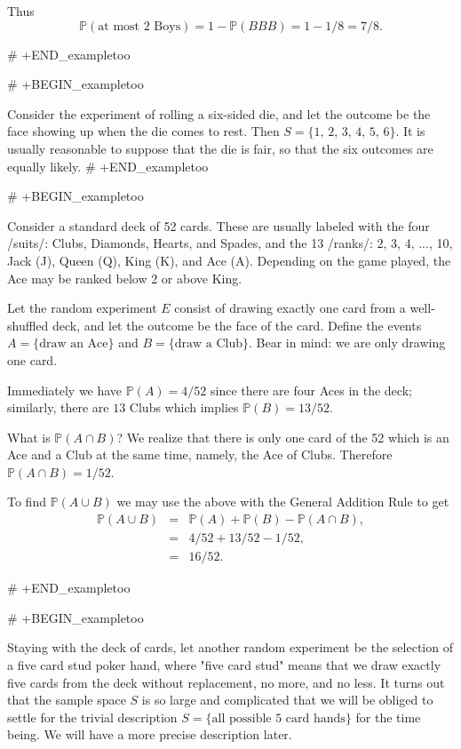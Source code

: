 Thus \[ \mathbb{P}(\mbox{at most 2 Boys}) = 1 - \mathbb{P}(BBB) = 1 -
1/8 = 7/8. \]

# +END_exampletoo


# +BEGIN_exampletoo

Consider the experiment of rolling a six-sided die, and let the
outcome be the face showing up when the die comes to rest. Then \( S =
\{ 1,\,2,\,3,\,4,\,5,\,6 \} \). It is usually reasonable to suppose
that the die is fair, so that the six outcomes are equally likely.
# +END_exampletoo


# +BEGIN_exampletoo

Consider a standard deck of 52 cards. These are usually labeled with
the four /suits/: Clubs, Diamonds, Hearts, and Spades, and the 13
/ranks/: 2, 3, 4, ..., 10, Jack (J), Queen (Q), King (K), and Ace
(A). Depending on the game played, the Ace may be ranked below 2 or
above King.

Let the random experiment \(E\) consist of drawing exactly one card
from a well-shuffled deck, and let the outcome be the face of the
card. Define the events \( A = \{ \mbox{draw an Ace} \} \) and \( B =
\{ \mbox{draw a Club} \} \). Bear in mind: we are only drawing one
card.

Immediately we have \(\mathbb{P}(A) = 4/52\) since there are four Aces
in the deck; similarly, there are \(13\) Clubs which implies
\(\mathbb{P}(B) = 13/52\).

What is \(\mathbb{P}(A\cap B)\)? We realize that there is only one
card of the 52 which is an Ace and a Club at the same time, namely,
the Ace of Clubs. Therefore \(\mathbb{P}(A\cap B)=1/52\).

To find \(\mathbb{P}(A\cup B)\) we may use the above with the General
Addition Rule to get
\begin{eqnarray*}
\mathbb{P}(A\cup B) & = & \mathbb{P}(A) + \mathbb{P}(B) - \mathbb{P}(A \cap B),\\
 & = & 4/52 + 13/52 - 1/52,\\
 & = & 16/52.
\end{eqnarray*}

# +END_exampletoo


# +BEGIN_exampletoo

Staying with the deck of cards, let another random experiment be the
selection of a five card stud poker hand, where "five card stud"
means that we draw exactly five cards from the deck without
replacement, no more, and no less. It turns out that the sample space
\(S\) is so large and complicated that we will be obliged to settle
for the trivial description \( S = \{ \mbox{all possible 5 card hands}
\} \) for the time being. We will have a more precise description
later.

